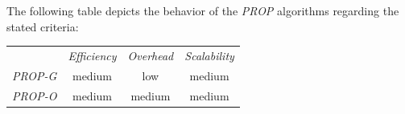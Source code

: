 The following table depicts the behavior of the \emph{PROP} 
algorithms regarding the stated criteria:
\begin{center}
{\footnotesize
\begin{tabular}{rccc}
\multicolumn{1}{r}{} &
\multicolumn{1}{c}{\emph{Efficiency}} &
\multicolumn{1}{c}{\emph{Overhead}} &
\multicolumn{1}{c}{\emph{Scalability}}
\\
\cline{2-4}
\emph{PROP-G} &
medium &
low &
medium \\
\emph{PROP-O} &
medium &
medium &
medium \\
\end{tabular}
}
\end{center}




